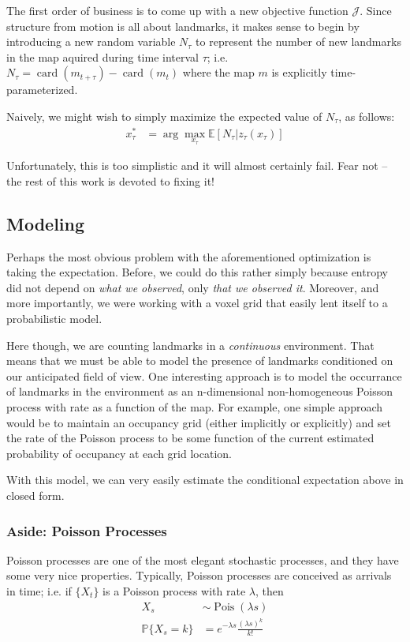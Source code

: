 \documentclass[12pt]{article}
\DeclareMathOperator{\card}{card}
\DeclareMathOperator{\Pois}{Pois}
\begin{document}
The first order of business is to come up with a new objective function $\mathcal{J}$. Since structure from motion is all about landmarks, it makes sense to begin by introducing a new random variable $N_{\tau}$ to represent the number of new landmarks in the map aquired during time interval $\tau$; i.e. $N_{\tau} = \card(m_{t + \tau}) - \card(m_t)$ where the map $m$ is explicitly time-parameterized.

Naively, we might wish to simply maximize the expected value of $N_{\tau}$, as follows:
\begin{align}
  x_{\tau}^* &= \arg \max_{x_{\tau}} \mathbb{E}[N_{\tau} | z_{\tau}(x_{\tau})]
\end{align}

Unfortunately, this is too simplistic and it will almost certainly fail. Fear not -- the rest of this work is devoted to fixing it!

\subsection{Modeling}

Perhaps the most obvious problem with the aforementioned optimization is taking the expectation. Before, we could do this rather simply because entropy did not depend on \textit{what we observed}, only \textit{that we observed it}. Moreover, and more importantly, we were working with a voxel grid that easily lent itself to a probabilistic model.

Here though, we are counting landmarks in a \textit{continuous} environment. That means that we must be able to model the presence of landmarks conditioned on our anticipated field of view. One interesting approach is to model the occurrance of landmarks in the environment as an n-dimensional non-homogeneous Poisson process with rate as a function of the map. For example, one simple approach would be to maintain an occupancy grid (either implicitly or explicitly) and set the rate of the Poisson process to be some function of the current estimated probability of occupancy at each grid location.

With this model, we can very easily estimate the conditional expectation above in closed form.

\subsubsection{Aside: Poisson Processes}

Poisson processes are one of the most elegant stochastic processes, and they have some very nice properties. Typically, Poisson processes are conceived as arrivals in time; i.e. if $\{X_t\}$ is a Poisson process with rate $\lambda$, then
\begin{align}
  X_s &\sim \Pois(\lambda s) \\
  \mathbb{P}\{X_s = k\} &= e^{-\lambda s}\frac{(\lambda s)^k}{k!}
\end{align}
\end{document}
